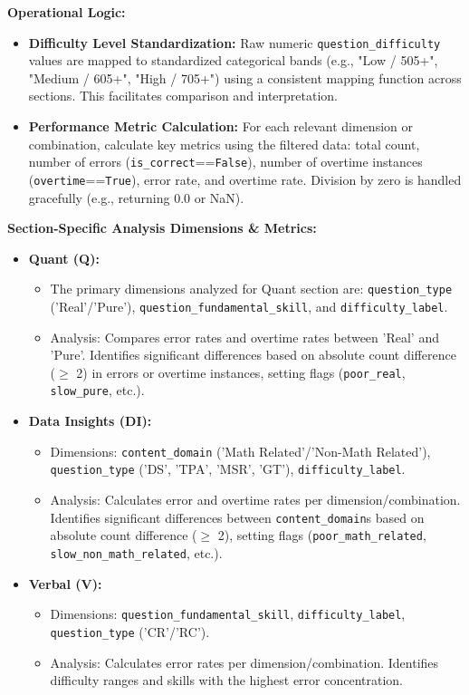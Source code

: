 \documentclass{article}
\begin{document}
\textbf{Operational Logic:}
\begin{itemize}
    \item \textbf{Difficulty Level Standardization:} Raw numeric \texttt{question\_difficulty} values are mapped to standardized categorical bands (e.g., "Low / 505+", "Medium / 605+", "High / 705+") using a consistent mapping function across sections. This facilitates comparison and interpretation.
    \item \textbf{Performance Metric Calculation:} For each relevant dimension or combination, calculate key metrics using the filtered data: total count, number of errors (\texttt{is\_correct}==\texttt{False}), number of overtime instances (\texttt{overtime}==\texttt{True}), error rate, and overtime rate. Division by zero is handled gracefully (e.g., returning 0.0 or NaN).
\end{itemize}

\textbf{Section-Specific Analysis Dimensions \& Metrics:}
\begin{itemize}
    \item \textbf{Quant (Q):}
    \begin{itemize}
        \item The primary dimensions analyzed for Quant section are: \texttt{question\_type} ('Real'/'Pure'), \texttt{question\_fundamental\_skill}, and \texttt{difficulty\_label}.
        \item Analysis: Compares error rates and overtime rates between 'Real' and 'Pure'. Identifies significant differences based on absolute count difference ($\geq$ 2) in errors or overtime instances, setting flags (\texttt{poor\_real}, \texttt{slow\_pure}, etc.).
    \end{itemize}
    \item \textbf{Data Insights (DI):}
    \begin{itemize}
        \item Dimensions: \texttt{content\_domain} ('Math Related'/'Non-Math Related'), \texttt{question\_type} ('DS', 'TPA', 'MSR', 'GT'), \texttt{difficulty\_label}.
        \item Analysis: Calculates error and overtime rates per dimension/combination. Identifies significant differences between \texttt{content\_domain}s based on absolute count difference ($\geq$ 2), setting flags (\texttt{poor\_math\_related}, \texttt{slow\_non\_math\_related}, etc.).
    \end{itemize}
    \item \textbf{Verbal (V):}
    \begin{itemize}
        \item Dimensions: \texttt{question\_fundamental\_skill}, \texttt{difficulty\_label}, \texttt{question\_type} ('CR'/'RC').
        \item Analysis: Calculates error rates per dimension/combination. Identifies difficulty ranges and skills with the highest error concentration.
    \end{itemize}
\end{itemize}
\end{document}

